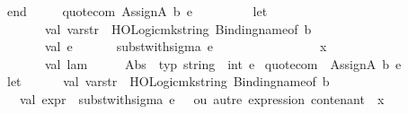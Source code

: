 \begin{isabellebody}
\ \ \ \ end{\isacharasterisk}{\kern0pt}{\isacharparenright}{\kern0pt}\isanewline
\ \ \ {\isacharparenleft}{\kern0pt}{\isacharasterisk}{\kern0pt}\ {\isacharbar}{\kern0pt}\ quote{\isacharunderscore}{\kern0pt}com\ {\isacharparenleft}{\kern0pt}AssignA\ {\isacharparenleft}{\kern0pt}b{\isacharcomma}{\kern0pt}\ e{\isacharparenright}{\kern0pt}{\isacharparenright}{\kern0pt}\ {\isacharequal}{\kern0pt}\isanewline
\ \ \ \ \ \ \ \ let\isanewline
\ \ \ \ \ \ \ \ \ \ val\ var{\isacharunderscore}{\kern0pt}str\ {\isacharequal}{\kern0pt}\ HOLogic{\isachardot}{\kern0pt}mk{\isacharunderscore}{\kern0pt}string\ {\isacharparenleft}{\kern0pt}Binding{\isachardot}{\kern0pt}name{\isacharunderscore}{\kern0pt}of\ b{\isacharparenright}{\kern0pt}\isanewline
\ \ \ \ \ \ \ \ \ \ val\ e{\isacharprime}{\kern0pt}\ \ \ \ \ \ {\isacharequal}{\kern0pt}\ subst{\isacharunderscore}{\kern0pt}with{\isacharunderscore}{\kern0pt}sigma\ e\ \ \ \ \ \ \ \ \ \ \ \ \ \ \ {\isacharparenleft}{\kern0pt}{\isacharasterisk}{\kern0pt}\ {\isasymsigma}\ {\isacharprime}{\kern0pt}{\isacharprime}{\kern0pt}x{\isacharprime}{\kern0pt}{\isacharprime}{\kern0pt}\ {\isasymdots}\ {\isacharasterisk}{\kern0pt}{\isacharparenright}{\kern0pt}\isanewline
\ \ \ \ \ \ \ \ \ \ val\ lam\ \ \ \ \ {\isacharequal}{\kern0pt}\ Abs\ {\isacharparenleft}{\kern0pt}{\isachardoublequote}{\kern0pt}{\isasymsigma}{\isachardoublequote}{\kern0pt}{\isacharcomma}{\kern0pt}\ {\isacharat}{\kern0pt}{\isacharbraceleft}{\kern0pt}typ\ {\isachardoublequote}{\kern0pt}string\ {\isasymRightarrow}\ int{\isachardoublequote}{\kern0pt}{\isacharbraceright}{\kern0pt}{\isacharcomma}{\kern0pt}\ e{\isacharprime}{\kern0pt}{\isacharparenright}{\kern0pt}{\isacharasterisk}{\kern0pt}{\isacharparenright}{\kern0pt}\isanewline
{\isacharbar}{\kern0pt}\ quote{\isacharunderscore}{\kern0pt}com\ {\isacharunderscore}{\kern0pt}\ {\isacharparenleft}{\kern0pt}AssignA\ {\isacharparenleft}{\kern0pt}b{\isacharcomma}{\kern0pt}\ e{\isacharparenright}{\kern0pt}{\isacharparenright}{\kern0pt}\ {\isacharequal}{\kern0pt}\isanewline
\ \ \ \ let\isanewline
\ \ \ \ \ \ val\ var{\isacharunderscore}{\kern0pt}str\ {\isacharequal}{\kern0pt}\ HOLogic{\isachardot}{\kern0pt}mk{\isacharunderscore}{\kern0pt}string\ {\isacharparenleft}{\kern0pt}Binding{\isachardot}{\kern0pt}name{\isacharunderscore}{\kern0pt}of\ b{\isacharparenright}{\kern0pt}\isanewline
\ \ \ \ \ \ val\ expr\ {\isacharequal}{\kern0pt}\ subst{\isacharunderscore}{\kern0pt}with{\isacharunderscore}{\kern0pt}sigma\ e\ \ {\isacharparenleft}{\kern0pt}{\isacharasterisk}{\kern0pt}\ ou\ autre\ expression\ contenant\ {\isasymsigma}\ {\isacharprime}{\kern0pt}{\isacharprime}{\kern0pt}x{\isacharprime}{\kern0pt}{\isacharprime}{\kern0pt}\ {\isacharasterisk}{\kern0pt}{\isacharparenright}{\kern0pt}\isanewline

\end{isabellebody}
